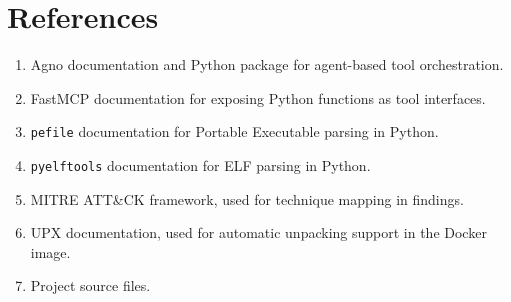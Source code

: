 \documentclass[11pt,a4paper]{article}
\begin{document}
\section{References}
\begin{enumerate}
\item Agno documentation and Python package for agent-based tool orchestration.
\item FastMCP documentation for exposing Python functions as tool interfaces.
\item \texttt{pefile} documentation for Portable Executable parsing in Python.
\item \texttt{pyelftools} documentation for ELF parsing in Python.
\item MITRE ATT\&CK framework, used for technique mapping in findings.
\item UPX documentation, used for automatic unpacking support in the Docker image.
\item Project source files.
\end{enumerate}
\end{document}
